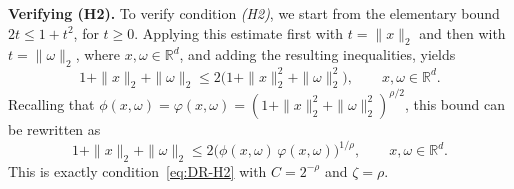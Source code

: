 \documentclass[a4paper,12pt]{article}
\let\originalleft\left
\let\originalright\right
\renewcommand{\left}{\mathopen{}\mathclose\bgroup\originalleft}
\renewcommand{\right}{\aftergroup\egroup\originalright}
\newcommand{\R}{\mathbb{R}}
\begin{document}

\textbf{Verifying (H2).}
To verify condition \emph{(H2)}, we start from the elementary bound $2t \le 1+t^2$, for $t\ge 0$.
Applying this estimate first with $t=\|x\|_2$ and then with $t=\|\omega\|_2$, where
$x,\omega\in\R^d$, and adding the resulting inequalities, yields
\[
1+\|x\|_2+\|\omega\|_2
\le
2\bigl(1+\|x\|_2^2+\|\omega\|_2^2\bigr),
\qquad x,\omega\in\R^d.
\]
Recalling that $\phi(x,\omega)=\varphi(x,\omega)
=(1+\|x\|_2^2+\|\omega\|_2^2)^{\rho/2}$, this bound can be rewritten as
\[
1+\|x\|_2+\|\omega\|_2
\le
2\bigl(\phi(x,\omega)\,\varphi(x,\omega)\bigr)^{1/\rho},
\qquad x,\omega\in\R^d.
\]
This is exactly condition~\eqref{eq:DR-H2} with $C=2^{-\rho}$ and $\zeta=\rho$.
\end{document}
